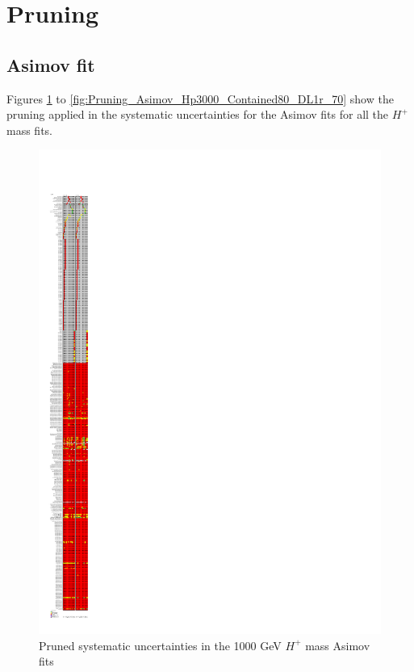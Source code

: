 \section{Pruning}
\label{app:Pruning}

\subsection{Asimov fit}
\label{app:PruningInAsimov}
Figures \ref{fig:Pruning_Asimov_Hp1000_Contained80_DL1r_70} to \ref{fig:Pruning_Asimov_Hp3000_Contained80_DL1r_70} show the pruning applied in the systematic uncertainties for the Asimov fits for all the $H^{+}$ mass fits.

\begin{figure}[H]
  \centering
  \includegraphics[keepaspectratio, scale=0.85]{images/Pruning/Pruning_Asimov_Hp1000_Contained80_DL1r_70.pdf}
  \caption{Pruned systematic uncertainties in the 1000 GeV $H^{+}$ mass Asimov fits}
  \label{fig:Pruning_Asimov_Hp1000_Contained80_DL1r_70}
\end{figure}


